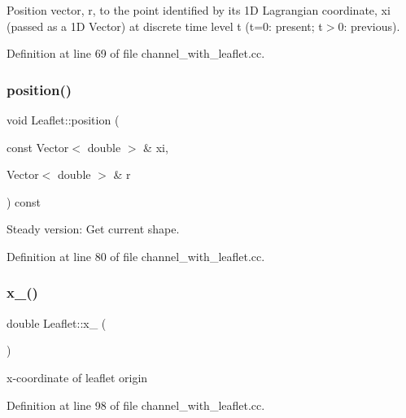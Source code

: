 Position vector, r, to the point identified by its 1D Lagrangian coordinate, xi (passed as a 1D Vector) at discrete time level t (t=0\+: present; t$>$0\+: previous). 



Definition at line 69 of file channel\+\_\+with\+\_\+leaflet.\+cc.

\mbox{\label{classLeaflet_a01daf4944eaaf7e9697eac53d78965f5}} 
\subsubsection{\texorpdfstring{position()}{position()}\hspace{0.1cm}{\footnotesize\ttfamily [2/2]}}
{\footnotesize\ttfamily void Leaflet\+::position (\begin{DoxyParamCaption}\item[{const Vector$<$ double $>$ \&}]{xi,  }\item[{Vector$<$ double $>$ \&}]{r }\end{DoxyParamCaption}) const\hspace{0.3cm}{\ttfamily [inline]}}



Steady version\+: Get current shape. 



Definition at line 80 of file channel\+\_\+with\+\_\+leaflet.\+cc.

\mbox{\label{classLeaflet_af4a819a3ba64960f4b796dc5a0d3eb5b}} 
\subsubsection{\texorpdfstring{x\+\_()}{x\_0()}}
{\footnotesize\ttfamily double Leaflet\+::x\+\_ (\begin{DoxyParamCaption}{ }\end{DoxyParamCaption})\hspace{0.3cm}{\ttfamily [inline]}}



x-\/coordinate of leaflet origin 



Definition at line 98 of file channel\+\_\+with\+\_\+leaflet.\+cc.



